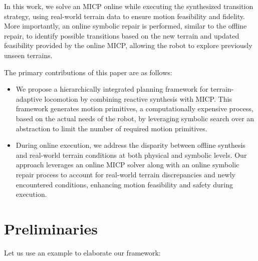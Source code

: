 \documentclass[letterpaper, 10 pt, conference]{ieeeconf}
\begin{document}
In this work, we solve an MICP online while executing the synthesized transition strategy, using real-world terrain data to ensure motion feasibility and fidelity. More importantly, an online symbolic repair is performed, similar to the offline repair, to identify possible transitions based on the new terrain and updated feasibility provided by the online MICP, allowing the robot to explore previously unseen terrains.

The primary contributions of this paper are as follows:
\begin{itemize}
    \item We propose a hierarchically integrated planning framework for terrain-adaptive locomotion by combining reactive synthesis with MICP. This framework generates motion primitives, a computationally expensive process, based on the actual needs of the robot, by leveraging symbolic search over an abstraction to limit the number of required motion primitives.
    \item During online execution, we address the disparity between offline synthesis and real-world terrain conditions at both physical and symbolic levels. Our approach leverages an online MICP solver along with an online symbolic repair process to account for real-world terrain discrepancies and newly encountered conditions, enhancing motion feasibility and safety during execution.
\end{itemize}

% 

\section{Preliminaries}
Let us use an example to elaborate our framework:
\end{document}
